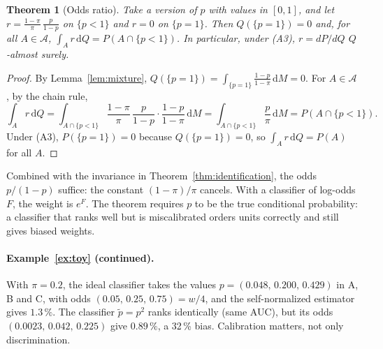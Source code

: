 \documentclass[11pt,a4paper]{article}
\newcommand{\A}{\mathcal{A}}
\newcommand{\dd}{\,\mathrm{d}}
\theoremstyle{plain}
\newtheorem{theorem}{Theorem}
\theoremstyle{definition}
\begin{document}
\begin{theorem}[Odds ratio]\label{thm:odds}
Take a version of $p$ with values in $[0,1]$, and let $r=\frac{1-\pi}{\pi}\,\frac{p}{1-p}$ on $\{p<1\}$ and $r=0$ on $\{p=1\}$. Then $Q(\{p=1\})=0$ and, for all $A\in\A$, $\int_A r\dd Q=P(A\cap\{p<1\})$. In particular, under (A3), $r=dP/dQ$ $Q$-almost surely.
\end{theorem}
\begin{proof}
By Lemma~\ref{lem:mixture}, $Q(\{p=1\})=\int_{\{p=1\}}\frac{1-p}{1-\pi}\dd M=0$. For $A\in\A$, by the chain rule,
\[
\int_A r\dd Q=\int_{A\cap\{p<1\}}\frac{1-\pi}{\pi}\,\frac{p}{1-p}\cdot\frac{1-p}{1-\pi}\dd M=\int_{A\cap\{p<1\}}\frac{p}{\pi}\dd M=P(A\cap\{p<1\}).
\]
Under (A3), $P(\{p=1\})=0$ because $Q(\{p=1\})=0$, so $\int_A r\dd Q=P(A)$ for all $A$.
\end{proof}

Combined with the invariance in Theorem~\ref{thm:identification}, the odds $p/(1-p)$ suffice: the constant $(1-\pi)/\pi$ cancels. With a classifier of log-odds $F$, the weight is $e^{F}$. The theorem requires $p$ to be the true conditional probability: a classifier that ranks well but is miscalibrated orders units correctly and still gives biased weights.

\paragraph{Example~\ref{ex:toy} (continued).}
With $\pi=0.2$, the ideal classifier takes the values $p=(0.048,\,0.200,\,0.429)$ in A, B and C, with odds $(0.05,\,0.25,\,0.75)=w/4$, and the self-normalized estimator gives $1.3\,\%$. The classifier $\tilde p=p^2$ ranks identically (same AUC), but its odds $(0.0023,\,0.042,\,0.225)$ give $0.89\,\%$, a 32\,\% bias. Calibration matters, not only discrimination.
\end{document}
